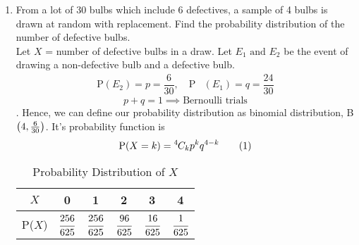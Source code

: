 \begin{enumerate}[label=13.\arabic{enumi}.\arabic{enumii}]

\setcounter{enumi}{3}
\setcounter{enumii}{6}
\item From a lot of 30 bulbs which include 6 defectives, a sample of 4 bulbs is drawn at random with replacement. Find the probability distribution of the number of defective bulbs.\\[1ex]
	\solution
		Let $X$ = number of defective bulbs in a draw. Let $E_1 \text{ and } E_2$ be the event of drawing a non-defective bulb and a defective bulb.
	\begin{align*}
		\text{P}(E_2)= p = \dfrac{6}{30}, \quad \text{P}&(E_1)= q = \dfrac{24}{30}
	\end{align*}
		\[p+q=1 \implies \text{Bernoulli trials}\].
		Hence, we can define our probability distribution as binomial distribution, B$\left(4,\frac{6}{30}\right)$. It's probability function is \[\text{P($X=k$)}=\comb{4}{k}p^kq^{4-k} \numberthis \]
	\begin{table}[h!]
	\normalsize
	\centering
			\begin{tabular}[20pt]{|c|c|c|c|c|c|} \hline		%
			$X$&0&1&2&3&4 \T \\ \hline
			P($X$)&$\cfrac{256}{625}$&$\cfrac{256}{625}$&$\cfrac{96}{625}$&$\cfrac{16}{625}$&$\cfrac{1}{625}$\\[1.5ex] \hline
		\end{tabular}\\[2ex]
		\caption{Probability Distribution of $X$}
	\end{table}

\noindent{}

\end{enumerate}
